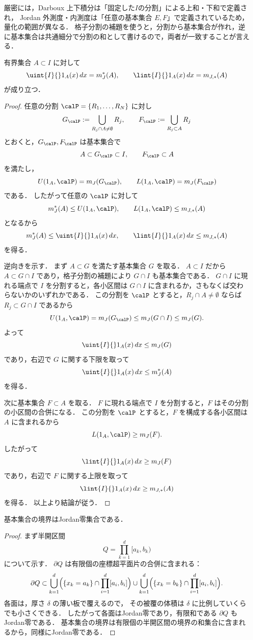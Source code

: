 厳密には，Darboux 上下積分は「固定した$I$の分割」による上和・下和で定義され，
Jordan 外測度・内測度は「任意の基本集合 $E,F$」で定義されているため，量化の範囲が異なる．
格子分割の補題を使うと，分割から基本集合が作れ，逆に基本集合は共通細分で分割の和として書けるので，両者が一致することが言える．

\begin{lemma}
有界集合 $A \subset I$ に対して
\[
\uint{I}{} 1_A(x)\,dx = m_J^*(A),
\qquad
\lint{I}{} 1_A(x)\,dx = m_{J,*}(A)
\]
が成り立つ．
\end{lemma}
\begin{proof}
任意の分割 $\calP=\{R_1,\dots,R_N\}$ に対し
\[
G_{\calP}:=\bigcup_{R_j\cap A\neq\emptyset}R_j,
\qquad
F_{\calP}:=\bigcup_{R_j\subset A}R_j
\]
とおくと，$G_{\calP},F_{\calP}$ は基本集合で
\[
A\subset G_{\calP}\subset I,
\qquad
F_{\calP}\subset A
\]
を満たし，
\[
U(1_A,\calP)=m_J(G_{\calP}),
\qquad
L(1_A,\calP)=m_J(F_{\calP})
\]
である．
したがって任意の $\calP$ に対して
\[
m_J^*(A)\le U(1_A,\calP),
\qquad
L(1_A,\calP)\le m_{J,*}(A)
\]
となるから
\[
m_J^*(A)\le \uint{I}{}1_A(x)\,dx,
\qquad
\lint{I}{}1_A(x)\,dx\le m_{J,*}(A)
\]
を得る．

逆向きを示す．
まず $A\subset G$ を満たす基本集合 $G$ を取る．
$A\subset I$ だから $A\subset G\cap I$ であり，格子分割の補題により $G\cap I$ も基本集合である．
$G\cap I$ に現れる端点で $I$ を分割すると，各小区間は $G\cap I$ に含まれるか，さもなくば交わらないかのいずれかである．
この分割を $\calP$ とすると，$R_j\cap A\neq\emptyset$ ならば $R_j\subset G\cap I$ であるから
\[
U(1_A,\calP)
=m_J(G_{\calP})
\le m_J(G\cap I)
\le m_J(G).
\]
よって
\[
\uint{I}{}1_A(x)\,dx\le m_J(G)
\]
であり，右辺で $G$ に関する下限を取って
\[
\uint{I}{}1_A(x)\,dx\le m_J^*(A)
\]
を得る．

次に基本集合 $F\subset A$ を取る．
$F$ に現れる端点で $I$ を分割すると，$F$ はその分割の小区間の合併になる．
この分割を $\calP$ とすると，$F$ を構成する各小区間は $A$ に含まれるから
\[
L(1_A,\calP)\ge m_J(F).
\]
したがって
\[
\lint{I}{}1_A(x)\,dx\ge m_J(F)
\]
であり，右辺で $F$ に関する上限を取って
\[
\lint{I}{}1_A(x)\,dx\ge m_{J,*}(A)
\]
を得る．
以上より結論が従う．
\end{proof}

\begin{lemma}
基本集合の境界はJordan零集合である．
\end{lemma}
\begin{proof}
まず半開区間
\[
Q = \prod_{k=1}^d [a_k,b_k)
\]
について示す．
$\partial Q$ は有限個の座標超平面片の合併に含まれる：
\[
\partial Q \subset
\bigcup_{k=1}^d
\Bigl(
\{x_k=a_k\} \cap \prod_{i=1}^d [a_i,b_i]
\Bigr)
\cup
\bigcup_{k=1}^d
\Bigl(
\{x_k=b_k\} \cap \prod_{i=1}^d [a_i,b_i]
\Bigr).
\]
各面は，厚さ $\delta$ の薄い板で覆えるので，
その被覆の体積は $\delta$ に比例していくらでも小さくできる．
したがって各面はJordan零であり，有限和である $\partial Q$ もJordan零である．
基本集合の境界は有限個の半開区間の境界の和集合に含まれるから，同様にJordan零である．
\end{proof}

